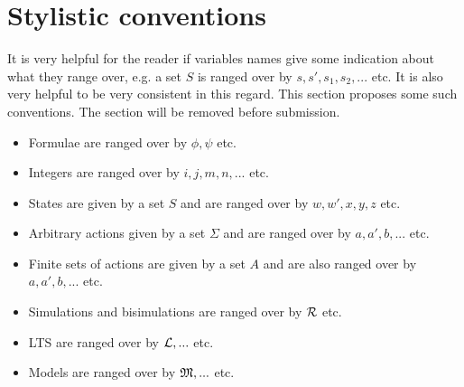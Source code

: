 \section{Stylistic conventions}

It is very helpful for the reader if variables names give some
indication about what they range over, e.g. a set $S$ is ranged over
by $s, s', s_1, s_2, ...$ etc.  It is also very helpful to be very
consistent in this regard.  This section proposes some such
conventions. The section will be removed before submission.

\begin{itemize}

\item Formulae  are ranged over by $\phi, \psi$ etc.
\item Integers are ranged over by $i, j, m, n, ...$ etc.
\item States are given by a set $S$ and  are ranged over by $w, w', x, y, z$ etc.
\item Arbitrary actions given by a set $\Sigma$ and are ranged over by $a, a', b, ...$ etc.
\item Finite sets of actions are given by a set $A$ and are also ranged over by $a, a', b, ...$ etc.
\item Simulations and bisimulations are ranged over by $\mathcal{R}$ etc.
\item LTS are ranged over by $\mathcal{L}, ...$ etc.
\item Models are ranged over by $\mathfrak{M}, ...$ etc.

\end{itemize}
